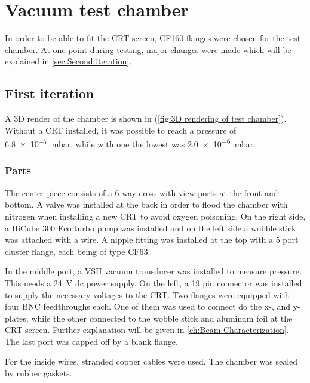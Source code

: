 
\chapter{Vacuum test chamber}
\label{ch:Vacuum chamber}

In order to be able to fit the CRT screen, CF160 flanges were chosen for the test chamber. At one point during testing, major changes were made which will be explained in \cref{sec:Second iteration}.

\section{First iteration}
\label{sec:vacuum chamber first iteration}

A 3D render of the chamber is shown in  (\cref{fig:3D rendering of test chamber}). Without a CRT installed, it was possible to reach a pressure of \SI{6.8e-7}{\milli\bar}, while with one the lowest was \SI{2.0e-6}{\milli\bar}.
 
\subsection{Parts}
\label{subsec:Parts}
 
The center piece consists of a 6-way cross with view ports at the front and bottom. A valve was installed at the back in order to flood the chamber with nitrogen when installing a new CRT to avoid oxygen poisoning. On the right side, a HiCube 300 Eco turbo pump was installed and on the left side a wobble stick was attached with a wire. A nipple fitting  was installed at the top with a 5 port cluster flange, each being of type CF63.
 
In the middle port, a VSH vacuum transducer was installed to measure pressure. This needs a \SI{24}{\volt} dc power supply. On the left, a 19 pin connector  was installed to supply the necessary voltages to the CRT. Two flanges were equipped with four BNC feedthroughs each. One of them was used to connect do the x-, and y-plates, while the other connected to the wobble stick and aluminum foil at the CRT screen. Further explanation will be given in \cref{ch:Beam Characterization}. The last port was capped off by a blank flange.
 
For the inside wires, stranded copper cables were used. The chamber was sealed by rubber gaskets.
 
